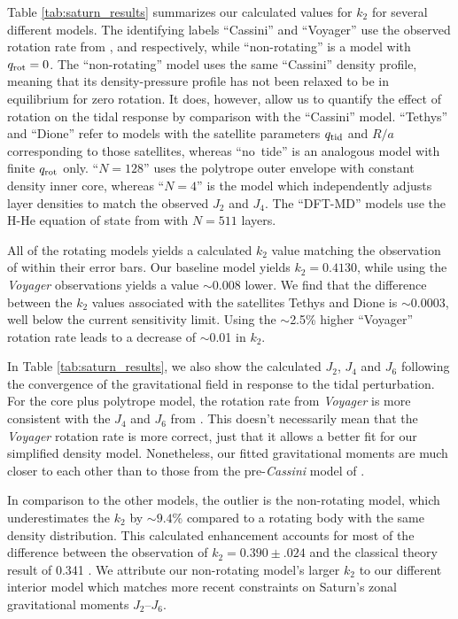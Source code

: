 Table \ref{tab:saturn_results} summarizes our calculated values for $k_2$ for several
different models. The identifying labels ``Cassini'' and ``Voyager'' use the
observed rotation rate from \citet{Jacobson2006}, and \citet{desch1981}
respectively, while ``non-rotating'' is a model with $q_{\rm rot}=0$. The
``non-rotating'' model uses the same ``Cassini'' density profile, meaning that
its density-pressure profile has not been relaxed to be in equilibrium for zero
rotation.  It does, however, allow us to quantify the effect of rotation on the
tidal response by comparison with the ``Cassini'' model. ``Tethys'' and
``Dione'' refer to models with the satellite parameters $q_{\rm tid}$ and $R/a$
corresponding to those satellites, whereas ``no~tide'' is an analogous model
with finite $q_{\rm rot}$ only. ``$N=128$'' uses the polytrope outer envelope
with constant density inner core, whereas ``$N=4$'' is the model which
independently adjusts layer densities to match the observed $J_2$ and $J_4$.
The ``DFT-MD'' models use the H-He equation of state from
\citet{hubbard2016} with $N=511$ layers.

All of the rotating models yields a calculated $k_2$ value matching the observation
of \citet{lainey2016} within their error bars. Our baseline model yields
$k_2=0.4130$, while using the \textit{Voyager} observations yields a value
$\sim$0.008 lower. We find that the difference between the $k_2$ values associated
with the satellites Tethys and Dione is $\sim$0.0003, well below the current
sensitivity limit. Using the $\sim$2.5\% higher ``Voyager'' rotation rate leads to a
decrease of $\sim$0.01 in $k_2$. 

In Table \ref{tab:saturn_results}, we also show the calculated $J_2$, $J_4$ and $J_6$
following the convergence of the gravitational field in response to the tidal
perturbation. For the core plus polytrope model, the rotation rate from
\textit{Voyager} is more consistent with the $J_4$ and $J_6$ from
\citet{Jacobson2006}. This doesn't necessarily mean that the \textit{Voyager}
rotation rate is more correct, just that it allows a better fit for our simplified
density model. Nonetheless, our fitted gravitational moments are much closer to each
other than to those from the pre-\textit{Cassini} model of \citet{gavrilov1977}.

In comparison to the other models, the outlier is the non-rotating model, which
underestimates the $k_2$ by $\sim9.4$\% compared to a rotating body with the same
density distribution.  This calculated enhancement accounts for most of the
difference between the observation of $k_2=0.390 \pm .024$ \citep{lainey2016} and the
classical theory result of 0.341 \citep{gavrilov1977}. We attribute our non-rotating
model's larger $k_2$ to our different interior model which matches more recent
constraints on Saturn's zonal gravitational moments $J_2$--$J_6$.


